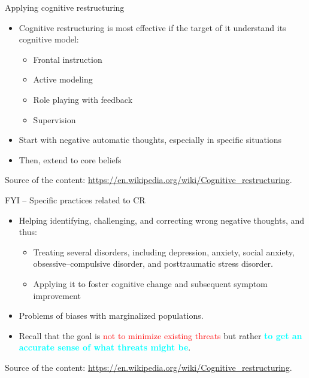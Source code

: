 \documentclass{beamer}
\begin{document}
\begin{frame}
{\centerline{Applying cognitive restructuring}}

\begin{itemize}
\item Cognitive restructuring is most effective if the target of it understand its cognitive model:
\begin{itemize}
\item Frontal instruction
\item Active modeling
\item Role playing with feedback
\item Supervision
\end{itemize} 
\item Start with negative automatic thoughts, especially in specific situations
\item Then, extend to core beliefs
\end{itemize} 


\begin{center}
\tiny
Source of the content: \url{https://en.wikipedia.org/wiki/Cognitive_restructuring}.
\end{center}

\end{frame}


\begin{frame}
{\centerline{FYI -- Specific practices related to CR}}

\begin{itemize}
\item Helping identifying, challenging, and correcting wrong negative thoughts, and thus:
\begin{itemize}
\item Treating several disorders, including depression, anxiety, social anxiety, obsessive–compulsive disorder, and posttraumatic stress disorder.
\item Applying it to foster cognitive change and subsequent symptom improvement
\end{itemize} 
\item Problems of biases with marginalized populations.
\item Recall that the goal is \textcolor{red}{not to minimize existing threats} but rather \textcolor{cyan}{\bf to get an accurate sense of what threats might be}.
\end{itemize} 

\begin{center}
\tiny
Source of the content: \url{https://en.wikipedia.org/wiki/Cognitive_restructuring}.
\end{center}

\end{frame}
\end{document}
